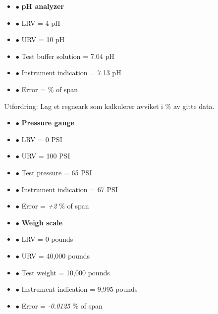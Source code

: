\vskip 10pt

\begin{itemize}
\item{$\bullet$} {\bf pH analyzer}
\item{$\bullet$} LRV = 4 pH
\item{$\bullet$} URV = 10 pH
\item{$\bullet$} Test buffer solution = 7.04 pH
\item{$\bullet$} Instrument indication = 7.13 pH
\item{$\bullet$} Error = \underbar{\hskip 50pt} \% of span
\medskip
\end{itemize}

\vskip 10pt


\vskip 10pt


Utfordring: Lag et regneark som kalkulerer avviket i \% av gitte data. 







\begin{itemize}
\item{$\bullet$} {\bf Pressure gauge}
\item{$\bullet$} LRV = 0 PSI
\item{$\bullet$} URV = 100 PSI 
\item{$\bullet$} Test pressure = 65 PSI 
\item{$\bullet$} Instrument indication = 67 PSI
\item{$\bullet$} Error = {\it +2} \% of span
\medskip
\end{itemize}

\vskip 10pt

\begin{itemize}
\item{$\bullet$} {\bf Weigh scale}
\item{$\bullet$} LRV = 0 pounds
\item{$\bullet$} URV = 40,000 pounds
\item{$\bullet$} Test weight = 10,000 pounds
\item{$\bullet$} Instrument indication = 9,995 pounds
\item{$\bullet$} Error = {\it -0.0125} \% of span
\medskip
\end{itemize}

